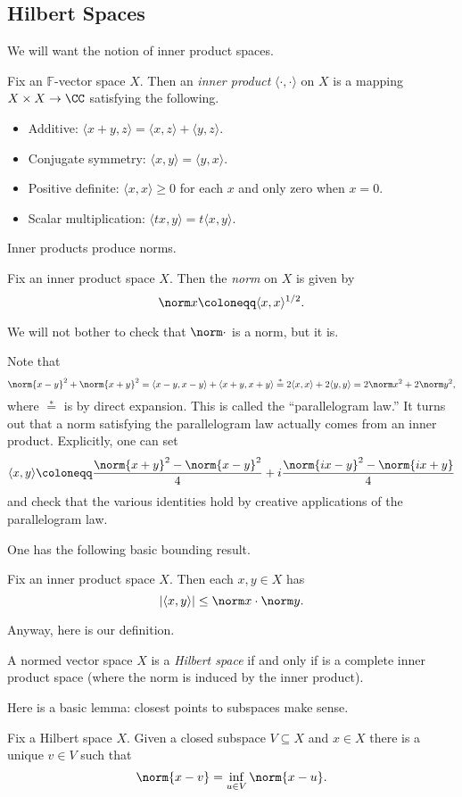 \documentclass[../notes.tex]{subfiles}
\begin{document}
\subsection{Hilbert Spaces}
We will want the notion of inner product spaces.
\begin{definition}
	Fix an $\mathbb F$-vector space $X$. Then an \textit{inner product} $\langle\cdot,\cdot\rangle$ on $X$ is a mapping $X\times X\to\CC$ satisfying the following.
	\begin{itemize}
		\item Additive: $\langle x+y,z\rangle=\langle x,z\rangle+\langle y,z\rangle$.
		\item Conjugate symmetry: $\langle x,y\rangle=\langle y,x\rangle$.
		\item Positive definite: $\langle x,x\rangle\ge0$ for each $x$ and only zero when $x=0$.
		\item Scalar multiplication: $\langle tx,y\rangle=t\langle x,y\rangle$.
	\end{itemize}
\end{definition}
Inner products produce norms.
\begin{definition}
	Fix an inner product space $X$. Then the \textit{norm} on $X$ is given by
	\[\norm x\coloneqq\langle x,x\rangle^{1/2}.\]
\end{definition}
We will not bother to check that $\norm\cdot$ is a norm, but it is.
\begin{remark}
	Note that
	\[\norm{x-y}^2+\norm{x+y}^2=\langle x-y,x-y\rangle+\langle x+y,x+y\rangle\stackrel*=2\langle x,x\rangle+2\langle y,y\rangle=2\norm x^2+2\norm y^2,\]
	where $\stackrel*=$ is by direct expansion. This is called the ``parallelogram law.'' It turns out that a norm satisfying the parallelogram law actually comes from an inner product. Explicitly, one can set
	\[\langle x,y\rangle\coloneqq\frac{\norm{x+y}^2-\norm{x-y}^2}4+i\frac{\norm{ix-y}^2-\norm{ix+y}}4\]
	and check that the various identities hold by creative applications of the parallelogram law.
\end{remark}
One has the following basic bounding result.
\begin{proposition}
	Fix an inner product space $X$. Then each $x,y\in X$ has
	\[\left|\langle x,y\rangle\right|\le\norm x\cdot\norm y.\]
\end{proposition}
Anyway, here is our definition.
\begin{definition}
	A normed vector space $X$ is a \textit{Hilbert space} if and only if is a complete inner product space (where the norm is induced by the inner product).
\end{definition}
Here is a basic lemma: closest points to subspaces make sense.
\begin{lemma}
	Fix a Hilbert space $X$. Given a closed subspace $V\subseteq X$ and $x\in X$ there is a unique $v\in V$ such that
	\[\norm{x-v}=\inf_{u\in V}\norm{x-u}.\]
\end{lemma}
\end{document}
